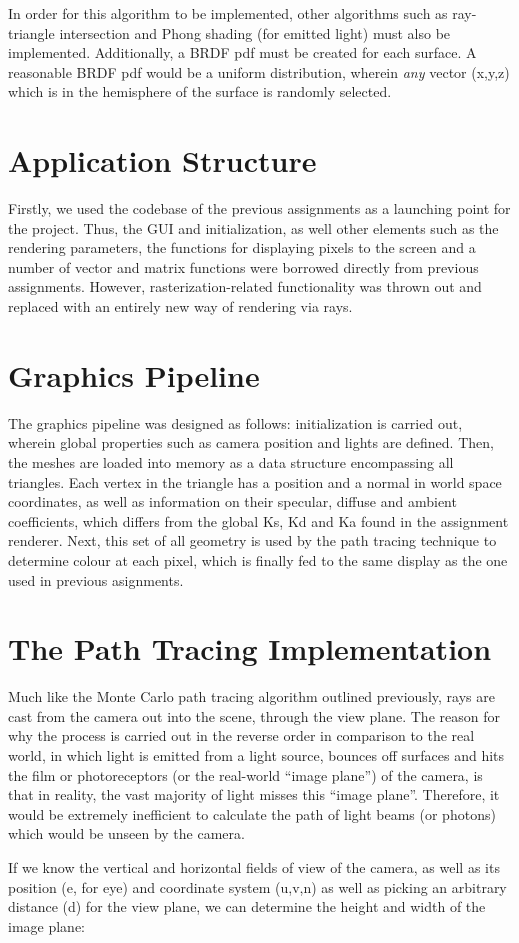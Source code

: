 \documentclass[journal]{IEEEtran}
\begin{document}
In order for this algorithm to be implemented, other algorithms such as ray-triangle intersection and Phong shading (for emitted light) must also be implemented. 
Additionally, a BRDF pdf must be created for each surface. A reasonable BRDF pdf would be a uniform distribution, wherein \emph{any} 
vector (x,y,z) which is in the hemisphere of the surface is randomly selected.

\section{Application Structure}
Firstly, we used the codebase of the previous assignments as a launching point for the project. Thus, the GUI and initialization, as well other elements such as the rendering parameters, the functions for displaying pixels to the screen and a number of vector and matrix functions were borrowed directly from previous assignments. However, rasterization-related functionality was thrown out and replaced with an entirely new way of rendering via rays.

\section{Graphics Pipeline}
The graphics pipeline was designed as follows: initialization is carried out, wherein global properties such as camera position and lights are defined. Then, the meshes are loaded into memory as a data structure encompassing all triangles. Each vertex in the triangle has a position and a normal in world space coordinates, as well as information on their specular, diffuse and ambient coefficients, which differs from the global Ks, Kd and Ka found in the assignment renderer. Next, this set of all geometry is used by the path tracing technique to determine colour at each pixel, which is finally fed to the same display as the one used in previous asignments.

\section{The Path Tracing Implementation}
Much like the Monte Carlo path tracing algorithm outlined previously, rays are cast from the camera out into the scene, through the view plane. The reason for why the process is carried out in the reverse order in comparison to the real world, in which light is emitted from a light source, bounces off surfaces and hits the film or photoreceptors (or the real-world ``image plane'') of the camera, is that in reality, the vast majority of light misses this ``image plane''. Therefore, it would be extremely inefficient to calculate the path of light beams (or photons) which would be unseen by the camera.
\par
If we know the vertical and horizontal fields of view of the camera, as well as its position (e, for eye) and coordinate system (u,v,n) as well as picking an arbitrary distance (d) for the view plane, we can determine the height and width of the image plane:
\end{document}
